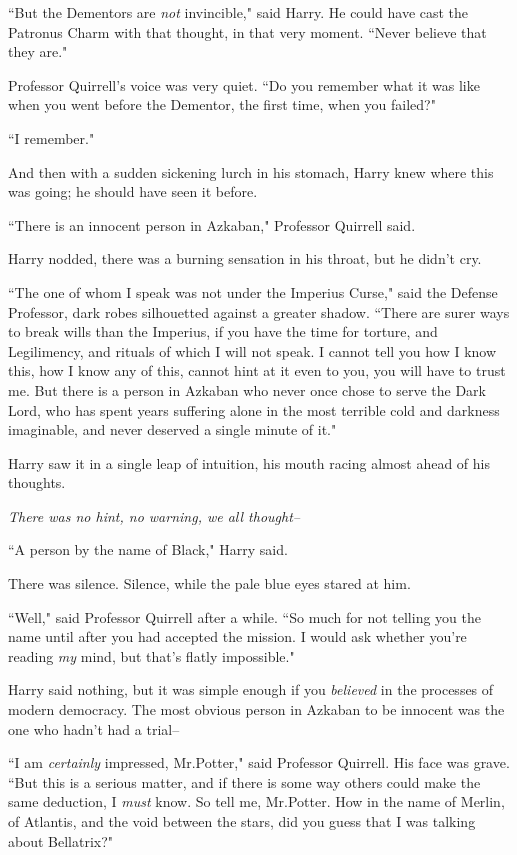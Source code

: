 ``But the Dementors are \emph{not} invincible," said Harry. He could have cast the Patronus Charm with that thought, in that very moment. ``Never believe that they are."

Professor Quirrell's voice was very quiet. ``Do you remember what it was like when you went before the Dementor, the first time, when you failed?"

``I remember."

And then with a sudden sickening lurch in his stomach, Harry knew where this was going; he should have seen it before.

``There is an innocent person in Azkaban," Professor Quirrell said.

Harry nodded, there was a burning sensation in his throat, but he didn't cry.

``The one of whom I speak was not under the Imperius Curse," said the Defense Professor, dark robes silhouetted against a greater shadow. ``There are surer ways to break wills than the Imperius, if you have the time for torture, and Legilimency, and rituals of which I will not speak. I cannot tell you how I know this, how I know any of this, cannot hint at it even to you, you will have to trust me. But there is a person in Azkaban who never once chose to serve the Dark Lord, who has spent years suffering alone in the most terrible cold and darkness imaginable, and never deserved a single minute of it."

Harry saw it in a single leap of intuition, his mouth racing almost ahead of his thoughts.

\emph{There was no hint, no warning, we all thought\---}

``A person by the name of Black," Harry said.

There was silence. Silence, while the pale blue eyes stared at him.

``Well," said Professor Quirrell after a while. ``So much for not telling you the name until after you had accepted the mission. I would ask whether you're reading \emph{my} mind, but that's flatly impossible."

Harry said nothing, but it was simple enough if you \emph{believed} in the processes of modern democracy. The most obvious person in Azkaban to be innocent was the one who hadn't had a trial\---

``I am \emph{certainly} impressed, Mr.\?Potter," said Professor Quirrell. His face was grave. ``But this is a serious matter, and if there is some way others could make the same deduction, I \emph{must} know. So tell me, Mr.\?Potter. How in the name of Merlin, of Atlantis, and the void between the stars, did you guess that I was talking about Bellatrix?"

